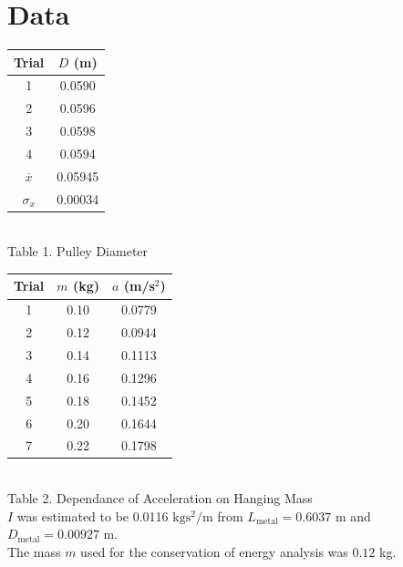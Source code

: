 \documentclass[12pt]{article}
\begin{document}
    \section{Data}
        \begin{center}
            \begin{tabular}{c|c}
                Trial & \(D\) (m)\\
                \hline
                1 & 0.0590\\
                2 & 0.0596\\
                3 & 0.0598\\
                4 & 0.0594\\
                \hline
                \(\overline{x}\) & 0.05945\\
                \(\sigma_x\) & 0.00034
            \end{tabular}\\
            Table 1. Pulley Diameter\\[12pt]
            \begin{tabular}{c|cc}
                Trial & \(m\) (kg) & \(a\) (m/s\(^2\))\\
                \hline
                1 & 0.10 & 0.0779\\
                2 & 0.12 & 0.0944\\
                3 & 0.14 & 0.1113\\
                4 & 0.16 & 0.1296\\
                5 & 0.18 & 0.1452\\
                6 & 0.20 & 0.1644\\
                7 & 0.22 & 0.1798\\
            \end{tabular}\\
            Table 2. Dependance of Acceleration on Hanging Mass\\[12pt]
            \(I\) was estimated to be 0.0116 \(\mathrm{kgs^2/m}\) from \(L_{\mathrm{metal}} = 0.6037\) m and \(D_{\mathrm{metal}} = 0.00927\) m.\\
            The mass \(m\) used for the conservation of energy analysis was \(0.12\) kg.
        \end{center}
\end{document}
